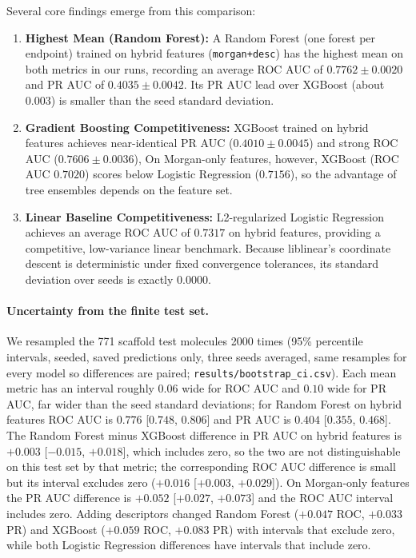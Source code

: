 Several core findings emerge from this comparison:
\begin{enumerate}
    \item \textbf{Highest Mean (Random Forest):} A Random Forest (one forest per endpoint) trained on hybrid features (\texttt{morgan+desc}) has the highest mean on both metrics in our runs, recording an average ROC AUC of $0.7762 \pm 0.0020$ and PR AUC of $0.4035 \pm 0.0042$. Its PR AUC lead over XGBoost (about $0.003$) is smaller than the seed standard deviation.
    \item \textbf{Gradient Boosting Competitiveness:} XGBoost trained on hybrid features achieves near-identical PR AUC ($0.4010 \pm 0.0045$) and strong ROC AUC ($0.7606 \pm 0.0036$), On Morgan-only features, however, XGBoost (ROC AUC $0.7020$) scores below Logistic Regression ($0.7156$), so the advantage of tree ensembles depends on the feature set.
    \item \textbf{Linear Baseline Competitiveness:} L2-regularized Logistic Regression achieves an average ROC AUC of $0.7317$ on hybrid features, providing a competitive, low-variance linear benchmark. Because liblinear's coordinate descent is deterministic under fixed convergence tolerances, its standard deviation over seeds is exactly $0.0000$.
\end{enumerate}

\paragraph{Uncertainty from the finite test set.} We resampled the 771 scaffold test molecules 2000 times (95\% percentile intervals, seeded, saved predictions only, three seeds averaged, same resamples for every model so differences are paired; \texttt{results/bootstrap\_ci.csv}). Each mean metric has an interval roughly $0.06$ wide for ROC AUC and $0.10$ wide for PR AUC, far wider than the seed standard deviations; for Random Forest on hybrid features ROC AUC is $0.776$ [$0.748$, $0.806$] and PR AUC is $0.404$ [$0.355$, $0.468$]. The Random Forest minus XGBoost difference in PR AUC on hybrid features is $+0.003$ [$-0.015$, $+0.018$], which includes zero, so the two are not distinguishable on this test set by that metric; the corresponding ROC AUC difference is small but its interval excludes zero ($+0.016$ [$+0.003$, $+0.029$]). On Morgan-only features the PR AUC difference is $+0.052$ [$+0.027$, $+0.073$] and the ROC AUC interval includes zero. Adding descriptors changed Random Forest ($+0.047$ ROC, $+0.033$ PR) and XGBoost ($+0.059$ ROC, $+0.083$ PR) with intervals that exclude zero, while both Logistic Regression differences have intervals that include zero.

